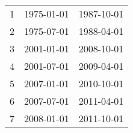 % 
\begin{tabular}{ccc}
  \hline
  \hline
1 & 1975-01-01 & 1987-10-01 \\ 
  2 & 1975-07-01 & 1988-04-01 \\ 
  3 & 2001-01-01 & 2008-10-01 \\ 
  4 & 2001-07-01 & 2009-04-01 \\ 
  5 & 2007-01-01 & 2010-10-01 \\ 
  6 & 2007-07-01 & 2011-04-01 \\ 
  7 & 2008-01-01 & 2011-10-01 \\ 
   \hline
\end{tabular}
